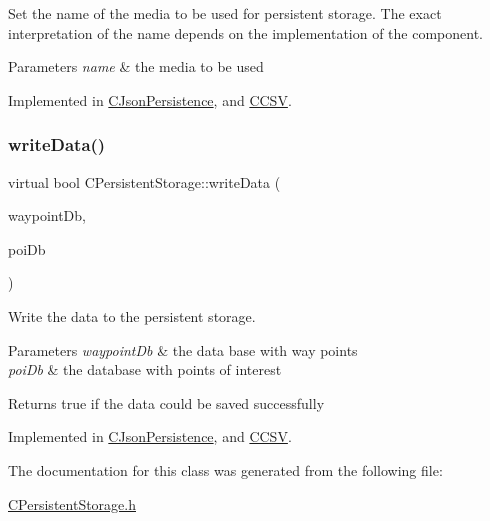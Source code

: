 Set the name of the media to be used for persistent storage. The exact interpretation of the name depends on the implementation of the component.


\begin{DoxyParams}{Parameters}
{\em name} & the media to be used \\
\hline
\end{DoxyParams}


Implemented in \hyperlink{classCJsonPersistence_a857d2c1a5de0f3fafceef1266e32a25d}{C\+Json\+Persistence}, and \hyperlink{classCCSV_a473f20a4cb83f3f50174a194121138d1}{C\+C\+SV}.

\mbox{\label{classCPersistentStorage_ab0c03dbf674c6218d574289ec54a75ed}} 
\subsubsection{\texorpdfstring{write\+Data()}{writeData()}}
{\footnotesize\ttfamily virtual bool C\+Persistent\+Storage\+::write\+Data (\begin{DoxyParamCaption}\item[{const \hyperlink{classCWpDatabase}{C\+Wp\+Database} \&}]{waypoint\+Db,  }\item[{const \hyperlink{classCPoiDatabase}{C\+Poi\+Database} \&}]{poi\+Db }\end{DoxyParamCaption})\hspace{0.3cm}{\ttfamily [pure virtual]}}

Write the data to the persistent storage.


\begin{DoxyParams}{Parameters}
{\em waypoint\+Db} & the data base with way points \\
\hline
{\em poi\+Db} & the database with points of interest \\
\hline
\end{DoxyParams}
\begin{DoxyReturn}{Returns}
true if the data could be saved successfully 
\end{DoxyReturn}


Implemented in \hyperlink{classCJsonPersistence_acd18e844bf7ec52ba1ec265ea2767dcb}{C\+Json\+Persistence}, and \hyperlink{classCCSV_a9f0f855c4337078ab3ccff7a3a8148fa}{C\+C\+SV}.



The documentation for this class was generated from the following file\+:\begin{DoxyCompactItemize}
\item 
\hyperlink{CPersistentStorage_8h}{C\+Persistent\+Storage.\+h}\end{DoxyCompactItemize}
